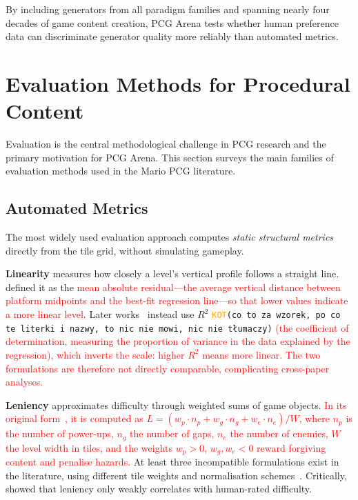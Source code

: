 \documentclass[shortabstract, mgr, english]{iithesis}
\newcommand{\DEBUG}[1]{{#1}} %
\newcommand{\KOT}[1]{\DEBUG{\tt{\textcolor{orange}{KOT}(}{#1}{)}}}
\newcommand{\changed}[1]{\textcolor{red}{#1}}
\begin{document}
By including generators from all paradigm families and spanning nearly four
decades of game content creation, PCG Arena tests whether human preference data
can discriminate generator quality more reliably than automated metrics.


\section{Evaluation Methods for Procedural Content}
\label{sec:bg-evaluation}

Evaluation is the central methodological challenge in PCG research and the
primary motivation for PCG Arena. This section surveys the main families of
evaluation methods used in the Mario PCG literature.

\subsection{Automated Metrics}
\label{subsec:bg-eval-automated}

The most widely used evaluation approach computes \emph{static structural
metrics} directly from the tile grid, without simulating gameplay.

\textbf{Linearity} measures how closely a level's vertical profile follows a
straight line. \citet{smith2010analyzing} defined it as the \changed{mean
absolute residual---the average vertical distance between platform midpoints
and the best-fit regression line---so that lower values indicate a more linear
level}. Later works~\citep{horn2014comparative,
summerville2017understanding} instead use $R^2$ \KOT{co to za wzorek, po co te literki i nazwy, to nic nie mowi, nic nie tłumaczy} \changed{(the coefficient of determination, measuring
the proportion of variance in the data explained by the regression),} \changed{which inverts the scale: higher $R^2$ means more linear. The two formulations are therefore not directly comparable, complicating cross-paper analyses.}

\textbf{Leniency} approximates difficulty through weighted sums of game objects.
\changed{In its original form~\citep{smith2010analyzing}, it is computed as
$L = (w_p \cdot n_p + w_g \cdot n_g + w_e \cdot n_e) / W$, where $n_p$ is the
number of power-ups, $n_g$ the number of gaps, $n_e$ the number of enemies, $W$
the level width in tiles, and the weights $w_p > 0$, $w_g, w_e < 0$ reward
forgiving content and penalise hazards.} At least three incompatible formulations exist in the literature, using different
tile weights and normalisation schemes~\citep{smith2010analyzing,
shaker2012evolving, marino2015empirical}. Critically,
\citet{marino2015empirical} showed that leniency only weakly correlates with
human-rated difficulty.
\end{document}

